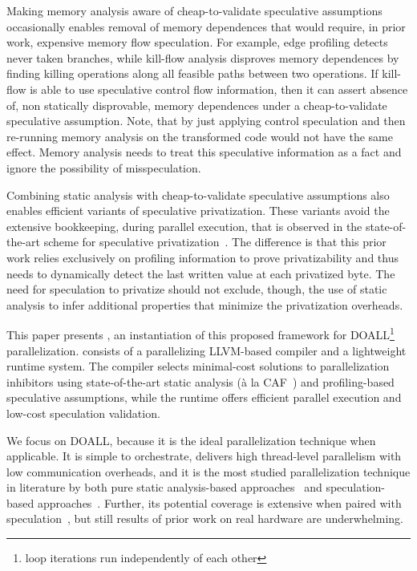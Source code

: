 Making memory analysis aware of cheap-to-validate speculative
assumptions occasionally enables removal of memory dependences that
would require, in prior work, expensive memory flow speculation.
%
For example, edge profiling detects never taken branches, while
kill-flow analysis disproves memory dependences by finding killing
operations along all feasible paths between two operations. If
kill-flow is able to use speculative control flow information, then it
can assert absence of, non statically disprovable, memory dependences
under a cheap-to-validate speculative assumption.
Note, that by just applying control speculation and then re-running
memory analysis on the transformed code would not have the same
effect.  Memory analysis needs to treat this speculative information
as a fact and ignore the possibility of misspeculation.

Combining static analysis with cheap-to-validate speculative
assumptions also enables efficient variants of speculative
privatization.
%
These variants avoid the extensive bookkeeping, during parallel
execution, that is observed in the state-of-the-art scheme for
speculative privatization~\cite{johnson:12:pldi}.
%
The difference is that this prior work relies exclusively on profiling
information to prove privatizability and thus needs to dynamically
detect the last written value at each privatized byte.
%
The need for speculation to privatize should not exclude, though, the
use of static analysis to infer additional properties that minimize
the privatization overheads.

This paper presents \name, an instantiation of this proposed framework
for DOALL\footnote{loop iterations run independently of each other}
parallelization. \name consists of a parallelizing LLVM-based compiler
and a lightweight
runtime system. The compiler selects minimal-cost solutions to
parallelization inhibitors using state-of-the-art static analysis
(\`{a} la CAF~\cite{johnson:cgo:17}) and profiling-based speculative
assumptions, while the runtime offers efficient parallel execution and
low-cost speculation validation.

We focus on DOALL, because it is the ideal parallelization technique
when applicable. It is simple to orchestrate, delivers high
thread-level parallelism with low communication overheads, and it is
the most studied parallelization technique in literature by both pure
static analysis-based approaches~\cite{..,.,..} and speculation-based
approaches~\cite{..,..,..,..}.  Further, its potential coverage is
extensive when paired with speculation~\cite{zhong:08:hpca}, but still
results of prior work on real hardware are underwhelming.

